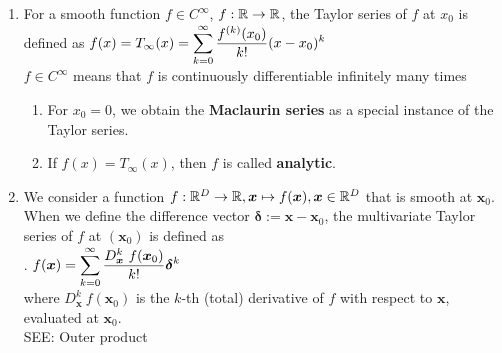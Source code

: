 \begin{enumerate}
    \item 
    \begin{definition}
        For a smooth function $f \in C^{\infty}$, $f : \mathbb{R} \to \mathbb{R}$, the Taylor series of $f$ at $x_0$ is defined as
        $
            f(x) = T_{\infty}(x)
            = \displaystyle\sum_{k=0}^{\infty} \dfrac{f^{(k)}(x_0)}{k!} (x - x_0)^k
        $
        \hfill \cite{mfml/book/mml/Deisenroth-Faisal-Ong}
        \\
         $f \in C^{\infty}$ means that $f$ is continuously differentiable infinitely many times
         \hfill \cite{mfml/book/mml/Deisenroth-Faisal-Ong}
    \end{definition}
    \begin{enumerate}
        \item 
        \begin{definition}        
            For $x_0 = 0$, we obtain the \textbf{Maclaurin series} as a special instance of the Taylor series. 
            \hfill \cite{mfml/book/mml/Deisenroth-Faisal-Ong}
        \end{definition}

        \item 
        \begin{definition}[Analytic]        
            If $f (x) = T_{\infty}(x)$, then $f$ is called \textbf{analytic}.
            \hfill \cite{mfml/book/mml/Deisenroth-Faisal-Ong}
        \end{definition}
    \end{enumerate}

    \item 
    \begin{definition}
        We consider a function $f: \mathbb{R}^D \to \mathbb{R}, \bm{x} \mapsto f(\bm{x}), \bm{x} \in \mathbb{R}^D$ that is smooth at $\bm{x}_0$. 
        When we define the difference vector $\bm{\delta} := \bm{x} - \bm{x}_0$, the multivariate Taylor series of $f$ at $(\bm{x}_0)$ is defined as
        \hfill \cite{mfml/book/mml/Deisenroth-Faisal-Ong}
        \\
        .\hfill
        $
            f(\bm{x})
            = \displaystyle\sum_{k=0}^{\infty} \dfrac{D^k_{\bm{x}}\ f(\bm{x}_0)}{k!} \bm{\delta}^k
        $
        \hfill \cite{mfml/book/mml/Deisenroth-Faisal-Ong}
        \\
        where $D^k _{\bm{x}}\ f (\bm{x}_0)$ is the $k$-th (total) derivative of $f$ with respect to $\bm{x}$, evaluated at $\bm{x}_0$.
        \\
        SEE: Outer product
        \hfill \cite{mfml/book/mml/Deisenroth-Faisal-Ong}
    \end{definition}


\end{enumerate}
